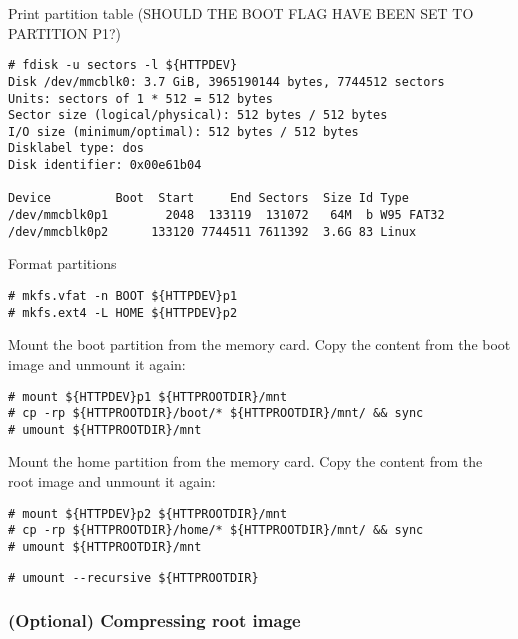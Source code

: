 Print partition table (SHOULD THE BOOT FLAG HAVE BEEN SET TO PARTITION P1?)
\begin{lstlisting}[]
# fdisk -u sectors -l ${HTTPDEV}
Disk /dev/mmcblk0: 3.7 GiB, 3965190144 bytes, 7744512 sectors
Units: sectors of 1 * 512 = 512 bytes
Sector size (logical/physical): 512 bytes / 512 bytes
I/O size (minimum/optimal): 512 bytes / 512 bytes
Disklabel type: dos
Disk identifier: 0x00e61b04

Device         Boot  Start     End Sectors  Size Id Type
/dev/mmcblk0p1        2048  133119  131072   64M  b W95 FAT32
/dev/mmcblk0p2      133120 7744511 7611392  3.6G 83 Linux
\end{lstlisting}
\FloatBarrier
\vspace{-5mm}

Format partitions
\begin{lstlisting}[]
# mkfs.vfat -n BOOT ${HTTPDEV}p1
# mkfs.ext4 -L HOME ${HTTPDEV}p2
\end{lstlisting}
\FloatBarrier
\vspace{-5mm}






Mount the boot partition from the memory card. Copy the content from the
boot image and unmount it again:
\begin{lstlisting}[]
# mount ${HTTPDEV}p1 ${HTTPROOTDIR}/mnt
# cp -rp ${HTTPROOTDIR}/boot/* ${HTTPROOTDIR}/mnt/ && sync
# umount ${HTTPROOTDIR}/mnt
\end{lstlisting}
\FloatBarrier
\vspace{-5mm}

Mount the home partition from the memory card. Copy the content from the
root image and unmount it again:
\begin{lstlisting}[]
# mount ${HTTPDEV}p2 ${HTTPROOTDIR}/mnt
# cp -rp ${HTTPROOTDIR}/home/* ${HTTPROOTDIR}/mnt/ && sync
# umount ${HTTPROOTDIR}/mnt
\end{lstlisting}
\FloatBarrier
\vspace{-5mm}


\begin{lstlisting}[]
# umount --recursive ${HTTPROOTDIR}
\end{lstlisting}
\FloatBarrier
\vspace{-5mm}


\subsubsection{(Optional) Compressing root image}

